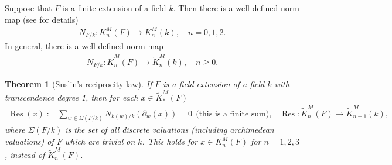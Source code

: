 \documentclass[12pt,amstex,amssymb]{article}
\theoremstyle{plain}
\newtheorem{theorem}{Theorem}[subsection]
\theoremstyle{definition}
\newcommand{\be}{\begin{eqnarray*}}
\newcommand{\ee}{\end{eqnarray*}}
\newcommand{\Res}{\operatorname{Res}}
\begin{document}
Suppose that $F$ is a finite extension of a field $k$.
Then there is a well-defined norm map (see \cite[Lemma 1.8]{Sus} for details)
\be
N_{F/k}:K^M_n(F) \to K^M_n(k), \quad n=0,1,2.
\ee
In general, there is a well-defined norm map
\be
N_{F/k}: \tilde K^M_n(F) \to \tilde K^M_n(k), \quad n\geq 0.
\ee

\begin{theorem}[Suslin's reciprocity law]\cite[Theorem 2.6]{Sus}\label{SRL}
If $F$ is a field extension of a field $k$ with transcendence degree 1, then for each $x\in \tilde K^M_\ast(F)$
\be
\Res(x):=  \sum_{w \in \Sigma(F/k)} N_{k(w)/k}(\partial_w(x))=0 \ \ \text{(this is a finite sum),}\quad  \Res:\tilde K^M_n(F) \to \tilde K^M_{n-1}(k),
\ee
where $\Sigma(F/k)$ is the set of all discrete valuations (including archimedean valuations) of $F$ which are trivial on $k$. This holds for $x \in K^M_n(F)$ for $n=1,2,3$, instead of $\tilde K^M_n(F)$.
\end{theorem}
\end{document}
